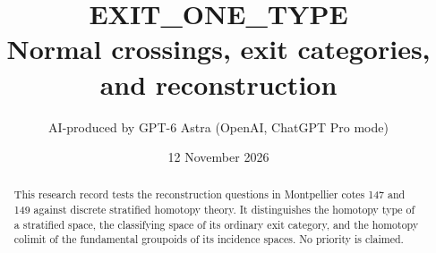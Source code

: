 \documentclass[11pt,a4paper]{article}
\title{EXIT\_ONE\_TYPE\\Normal crossings, exit categories, and reconstruction}
\author{AI-produced by GPT-6 Astra (OpenAI, ChatGPT Pro mode)}
\date{12 November 2026}
\begin{document}
\maketitle
\begin{abstract}
This research record tests the reconstruction questions in Montpellier cotes 147 and 149 against discrete stratified homotopy theory. It distinguishes the homotopy type of a stratified space, the classifying space of its ordinary exit category, and the homotopy colimit of the fundamental groupoids of its incidence spaces. No priority is claimed.
\end{abstract}
\tableofcontents







\end{document}
